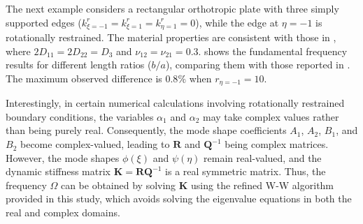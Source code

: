 \documentclass[preprint,12pt]{elsarticle}
\begin{document}
The next example considers a rectangular orthotropic plate with three simply supported edges ($k^r_{\xi=-1} = k^r_{\xi=1} = k^r_{\eta=1} = 0$), while the edge at $\eta = -1$ is rotationally restrained. 
The material properties are consistent with those in \citealp{zhang2019new}, where $2D_{11} = 2D_{22} = D_3$ and $\nu_{12} = \nu_{21} = 0.3$.  
 shows the fundamental frequency results for different length ratios ($b/a$), comparing them with those reported in \citealp{zhang2019new}. 
The maximum observed difference is $0.8\%$ when $r_{\eta=-1} = 10$. 

Interestingly, in certain numerical calculations involving rotationally restrained boundary conditions, the variables $\alpha_1$ and $\alpha_2$ may take complex values rather than being purely real.  
Consequently, the mode shape coefficients $A_1$, $A_2$, $B_1$, and $B_2$ become complex-valued, leading to $\mathbf{R}$ and $\mathbf{Q}^{-1}$ being complex matrices.  
However, the mode shapes $\phi(\xi)$ and $\psi(\eta)$ remain real-valued, and the dynamic stiffness matrix $\mathbf{K} = \mathbf{R}\mathbf{Q}^{-1}$ is a real symmetric matrix.
Thus, the frequency $\Omega$ can be obtained by solving $\mathbf{K}$ using the refined W-W algorithm provided in this study, which avoids solving the eigenvalue equations in both the real and complex domains.
\end{document}
